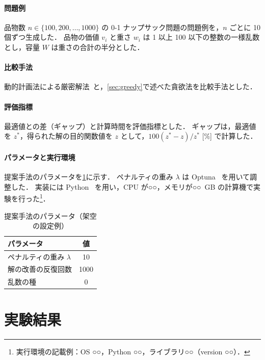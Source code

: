 \paragraph{問題例}
品物数 $n \in \{100, 200, \dots, 1000\}$ の 0-1 ナップサック問題の問題例を，$n$ ごとに 10 個ずつ生成した．
品物の価値 $v_i$ と重さ $w_i$ は 1 以上 100 以下の整数の一様乱数とし，容量 $W$ は重さの合計の半分とした．

\paragraph{比較手法}
動的計画法による厳密解法~\cite{kellerer2004knapsack}と，\cref{sec:greedy}で述べた貪欲法を比較手法とした．

\paragraph{評価指標}
最適値との差（ギャップ）と計算時間を評価指標とした．
ギャップは，最適値を $z^{*}$，得られた解の目的関数値を $z$ として，$100 (z^{*} - z) / z^{*}$ [\%] で計算した．

\paragraph{パラメータと実行環境}
提案手法のパラメータを\cref{tab:parameters}に示す．
ペナルティの重み $\lambda$ は Optuna~\cite{akiba2019optuna} を用いて調整した．
実装には Python~\cite{python} を用い，CPU が○○，メモリが○○~GB の計算機で実験を行った\footnote{%
  実行環境の記載例：OS ○○，Python ○○，ライブラリ○○（version ○○）．}．

\begin{table}[tbp]
  \centering
  \caption{提案手法のパラメータ（架空の設定例）}
  \label{tab:parameters}
  \begin{tabular}{lc}
    \toprule
    パラメータ & 値 \\
    \midrule
    ペナルティの重み $\lambda$ & 10 \\
    解の改善の反復回数 & 1000 \\
    乱数の種 & 0 \\
    \bottomrule
  \end{tabular}
\end{table}

\section{実験結果}
\label{sec:results}

